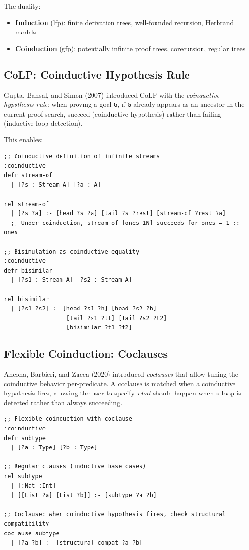 \documentclass[11pt]{article}
\begin{document}
The duality:
\begin{itemize}
\item \textbf{Induction} (lfp): finite derivation trees, well-founded recursion, Herbrand models
\item \textbf{Coinduction} (gfp): potentially infinite proof trees, corecursion, regular trees
\end{itemize}
\subsection{CoLP: Coinductive Hypothesis Rule}
\label{sec:orgb20be60}

Gupta, Bansal, and Simon (2007) introduced CoLP with the \emph{coinductive hypothesis
rule}: when proving a goal \texttt{G}, if \texttt{G} already appears as an ancestor in the
current proof search, succeed (coinductive hypothesis) rather than failing
(inductive loop detection).

This enables:

\begin{verbatim}
;; Coinductive definition of infinite streams
:coinductive
defr stream-of
  | [?s : Stream A] [?a : A]

rel stream-of
  | [?s ?a] :- [head ?s ?a] [tail ?s ?rest] [stream-of ?rest ?a]
  ;; Under coinduction, stream-of [ones 1N] succeeds for ones = 1 :: ones

;; Bisimulation as coinductive equality
:coinductive
defr bisimilar
  | [?s1 : Stream A] [?s2 : Stream A]

rel bisimilar
  | [?s1 ?s2] :- [head ?s1 ?h] [head ?s2 ?h]
                  [tail ?s1 ?t1] [tail ?s2 ?t2]
                  [bisimilar ?t1 ?t2]
\end{verbatim}
\subsection{Flexible Coinduction: Coclauses}
\label{sec:org1366910}

Ancona, Barbieri, and Zucca (2020) introduced \emph{coclauses} that allow tuning the
coinductive behavior per-predicate. A coclause is matched when a coinductive
hypothesis fires, allowing the user to specify \emph{what} should happen when a loop
is detected rather than always succeeding.

\begin{verbatim}
;; Flexible coinduction with coclause
:coinductive
defr subtype
  | [?a : Type] [?b : Type]

;; Regular clauses (inductive base cases)
rel subtype
  | [:Nat :Int]
  | [[List ?a] [List ?b]] :- [subtype ?a ?b]

;; Coclause: when coinductive hypothesis fires, check structural compatibility
coclause subtype
  | [?a ?b] :- [structural-compat ?a ?b]
\end{verbatim}
\end{document}
